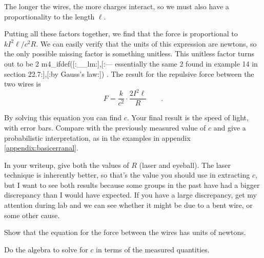 The longer the wires, the more charges interact, so we must also have a
proportionality to the length $\ell$.

Putting all these factors together, we find that the force
is proportional to $kI^2\ell/c^2R$. We can easily verify that the units of this expression
are newtons, so the only possible missing factor is something unitless. This
unitless factor turns out to be 2 
m4_ifdef([:__lm:],[:--- essentially the same 2 found in example 14 in section 22.7:],[:by Gauss's law:])%
.
The result for the repulsive force between the two wires is
\begin{equation*}
  F = \frac{k}{c^2} \cdot \frac{2I^2\ell}{R} \qquad .
\end{equation*}

By solving this equation you can find $c$.
Your final result is the speed of light, with error bars.
Compare with the previously measured value of $c$
and give a probabilistic interpretation, as in the examples
in appendix \ref{appendix:basicerranal}.

In your writeup, give both the values of $R$ (laser and eyeball). The laser
technique is inherently better, so that's the value you should use in extracting
$c$, but I want to see both results because some groups in the past have had
a bigger discrepancy than I would have expected. If you have a large discrepancy,
get my attention during lab and we can see whether it might be due to a bent wire,
or some other cause.

\prelab

\lasersafety

\prelabquestion Show that the equation for the force between the wires has units of newtons.

\prelabquestion Do the algebra to solve for $c$ in terms of the measured quantities.
